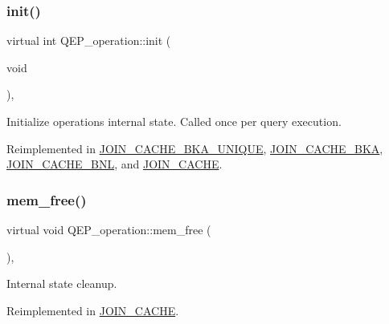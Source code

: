 \mbox{\label{classQEP__operation_a27930ae9c3ab63a046135704707190fa}} 
\subsubsection{\texorpdfstring{init()}{init()}}
{\footnotesize\ttfamily virtual int Q\+E\+P\+\_\+operation\+::init (\begin{DoxyParamCaption}\item[{void}]{ }\end{DoxyParamCaption})\hspace{0.3cm}{\ttfamily [inline]}, {\ttfamily [virtual]}}

Initialize operation\textquotesingle{}s internal state. Called once per query execution. 

Reimplemented in \mbox{\hyperlink{group__Query__Optimizer_gaa7ca6a85294c32bac8c69bea0c4e5fe1}{J\+O\+I\+N\+\_\+\+C\+A\+C\+H\+E\+\_\+\+B\+K\+A\+\_\+\+U\+N\+I\+Q\+UE}}, \mbox{\hyperlink{group__Query__Optimizer_ga327376f63198bf31a770fb89242d49aa}{J\+O\+I\+N\+\_\+\+C\+A\+C\+H\+E\+\_\+\+B\+KA}}, \mbox{\hyperlink{group__Query__Optimizer_gab3dbb0f8b69dc30985e0d9a0ff94121f}{J\+O\+I\+N\+\_\+\+C\+A\+C\+H\+E\+\_\+\+B\+NL}}, and \mbox{\hyperlink{classJOIN__CACHE_a1dcdce348bba725c675b327eb90aa924}{J\+O\+I\+N\+\_\+\+C\+A\+C\+HE}}.

\mbox{\label{classQEP__operation_a5a3acf4022e1369ca5eadef33f61ac80}} 
\subsubsection{\texorpdfstring{mem\+\_\+free()}{mem\_free()}}
{\footnotesize\ttfamily virtual void Q\+E\+P\+\_\+operation\+::mem\+\_\+free (\begin{DoxyParamCaption}{ }\end{DoxyParamCaption})\hspace{0.3cm}{\ttfamily [inline]}, {\ttfamily [virtual]}}

Internal state cleanup. 

Reimplemented in \mbox{\hyperlink{classJOIN__CACHE_a1607e84802fbf32ca66112ebdd0860b7}{J\+O\+I\+N\+\_\+\+C\+A\+C\+HE}}.


